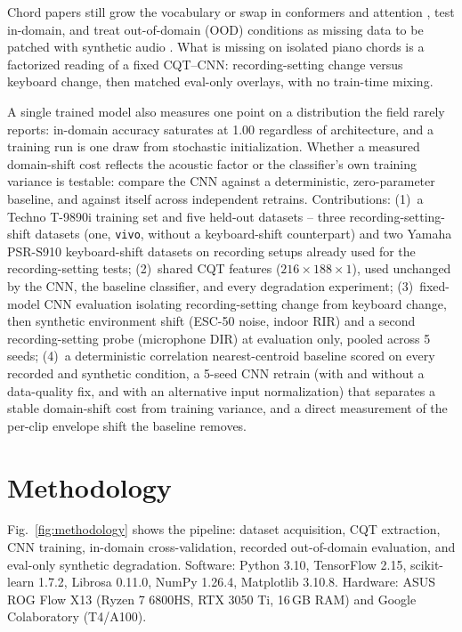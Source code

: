 \documentclass[pdflatex,sn-mathphys-num,iicol]{sn-jnl}
\theoremstyle{thmstyleone}
\theoremstyle{thmstyletwo}
\theoremstyle{thmstylethree}
\begin{document}
Chord papers still grow the vocabulary \cite{Majchrzak2025} or swap in conformers \cite{Akram2025} and attention \cite{Kusaka2024}, test in-domain, and treat out-of-domain (OOD) conditions as missing data to be patched with synthetic audio \cite{Byambatsogt2020}\cite{Ostermann2023}. What is missing on isolated piano chords is a factorized reading of a fixed CQT--CNN: recording-setting change versus keyboard change, then matched eval-only overlays, with no train-time mixing.

A single trained model also measures one point on a distribution the field rarely reports: in-domain accuracy saturates at 1.00 regardless of architecture, and a training run is one draw from stochastic initialization. Whether a measured domain-shift cost reflects the acoustic factor or the classifier's own training variance is testable: compare the CNN against a deterministic, zero-parameter baseline, and against itself across independent retrains. Contributions: (1)~a Techno T-9890i training set and five held-out datasets -- three recording-setting-shift datasets (one, \texttt{vivo}, without a keyboard-shift counterpart) and two Yamaha PSR-S910 keyboard-shift datasets on recording setups already used for the recording-setting tests; (2)~shared CQT features ($216\times188\times1$), used unchanged by the CNN, the baseline classifier, and every degradation experiment; (3)~fixed-model CNN evaluation isolating recording-setting change from keyboard change, then synthetic environment shift (ESC-50 noise, indoor RIR) and a second recording-setting probe (microphone DIR) at evaluation only, pooled across 5 seeds; (4)~a deterministic correlation nearest-centroid baseline scored on every recorded and synthetic condition, a 5-seed CNN retrain (with and without a data-quality fix, and with an alternative input normalization) that separates a stable domain-shift cost from training variance, and a direct measurement of the per-clip envelope shift the baseline removes.

\section{Methodology}\label{sec3}

Fig.~\ref{fig:methodology} shows the pipeline: dataset acquisition, CQT extraction, CNN training, in-domain cross-validation, recorded out-of-domain evaluation, and eval-only synthetic degradation. Software: Python 3.10, TensorFlow 2.15, scikit-learn 1.7.2, Librosa 0.11.0, NumPy 1.26.4, Matplotlib 3.10.8. Hardware: ASUS ROG Flow X13 (Ryzen 7 6800HS, RTX 3050 Ti, 16\,GB RAM) and Google Colaboratory (T4/A100).
\end{document}
